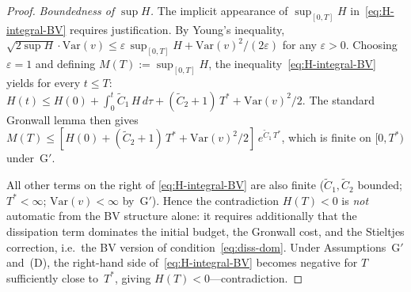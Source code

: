 \documentclass[12pt,a4paper]{article}
\theoremstyle{definition}
\theoremstyle{plain}
\theoremstyle{remark}
\begin{document}
\begin{proof}
\emph{Boundedness of $\sup H$.}\;
The implicit appearance of $\sup_{[0,T]} H$ in~\eqref{eq:H-integral-BV}
requires justification.  By Young's inequality,
$\sqrt{2\sup H}\cdot\mathrm{Var}(v)
\le \varepsilon\,\sup_{[0,T]} H + \mathrm{Var}(v)^2/(2\varepsilon)$
for any $\varepsilon > 0$.
Choosing $\varepsilon = 1$ and defining $M(T) := \sup_{[0,T]} H$,
the inequality~\eqref{eq:H-integral-BV} yields for every $t \le T$:
$H(t) \le H(0) + \int_0^t \widetilde{C}_1\,H\,d\tau
+ (\widetilde{C}_2+1)\,T^* + \mathrm{Var}(v)^2/2$.
The standard Gronwall lemma then gives
$M(T) \le [H(0) + (\widetilde{C}_2+1)\,T^*
+ \mathrm{Var}(v)^2/2]\,e^{\widetilde{C}_1\,T^*}$,
which is finite on $[0,T^*)$ under~G$'$.

All other terms on the right
of \eqref{eq:H-integral-BV} are also finite
($\widetilde{C}_1, \widetilde{C}_2$ bounded;
$T^* < \infty$; $\mathrm{Var}(v) < \infty$ by~G$'$).
Hence the contradiction $H(T) < 0$ is \emph{not} automatic from the
BV structure alone: it requires additionally that the dissipation
term dominates the initial budget, the Gronwall cost, and the
Stieltjes correction, i.e.\ the BV version of condition~\eqref{eq:diss-dom}.
Under Assumptions~G$'$ and~(D), the right-hand side
of~\eqref{eq:H-integral-BV} becomes negative for $T$ sufficiently
close to~$T^*$, giving $H(T) < 0$---contradiction.
\end{proof}
\end{document}
